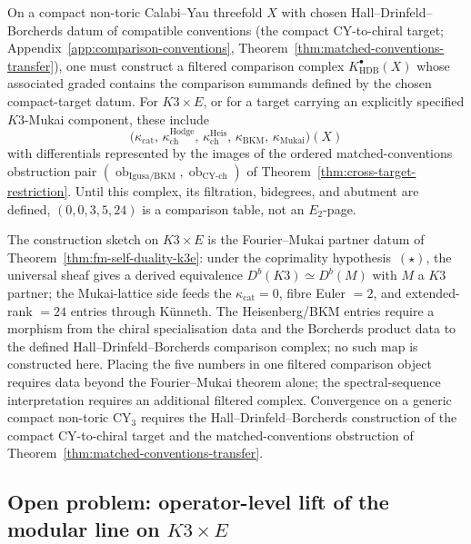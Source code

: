 \begin{conj}\label{conj:hall-drinfeld-borcherds-ss}
  On a compact non-toric Calabi--Yau threefold $X$ with chosen
  Hall--Drinfeld--Borcherds datum of compatible conventions
  (the compact CY-to-chiral target; Appendix~\ref{app:comparison-conventions},
  Theorem~\ref{thm:matched-conventions-transfer}), one must construct a
  filtered comparison complex
  \(K^\bullet_{\mathrm{HDB}}(X)\) whose associated graded contains
  the comparison summands defined by the chosen compact-target datum.  For
  \(K3\times E\), or for a target carrying an explicitly specified
  \(K3\)-Mukai component, these include
  \[
    \bigl(\kappa_{\mathrm{cat}},\,\kappa^{\mathrm{Hodge}}_{\mathrm{ch}},\,
    \kappa^{\mathrm{Heis}}_{\mathrm{ch}},\,
    \kappa_{\mathrm{BKM}},\,\kappa_{\mathrm{Mukai}}\bigr)(X)
  \]
  with differentials represented by the images of the ordered
  matched-conventions obstruction pair
  \((\operatorname{ob}_{\mathrm{Igusa/BKM}},
  \operatorname{ob}_{\mathrm{CY\mbox{-}ch}})\) of
  Theorem~\ref{thm:cross-target-restriction}.  Until this complex, its
  filtration, bidegrees, and abutment are defined, \((0,0,3,5,24)\)
  is a comparison table, not an \(E_2\)-page.
\end{conj}

The construction sketch on \(K3\times E\) is the Fourier--Mukai
partner datum of Theorem~\ref{thm:fm-self-duality-k3e}: under the
coprimality hypothesis~\((\star)\),
the universal sheaf gives a derived equivalence
$D^b(K3)\simeq D^b(M)$ with $M$ a $K3$ partner; the Mukai-lattice
side feeds the $\kappa_{\mathrm{cat}}=0$, fibre Euler $=2$, and
extended-rank $=24$ entries through K\"unneth.  The
Heisenberg/BKM entries require a morphism from the
chiral specialisation data and the Borcherds product data to the
defined Hall--Drinfeld--Borcherds comparison complex; no such map is
constructed here.  Placing the five numbers in one filtered comparison
object requires data beyond the Fourier--Mukai theorem alone; the
spectral-sequence interpretation requires an additional filtered complex.
Convergence on a generic compact
non-toric CY$_3$ requires the Hall--Drinfeld--Borcherds
construction of the compact CY-to-chiral target and the matched-conventions obstruction of
Theorem~\ref{thm:matched-conventions-transfer}.

\subsection{Open problem: operator-level lift of the modular line
  on \texorpdfstring{$K3\times E$}{K3 x E}}\label{ssec:open-modular-lift}

